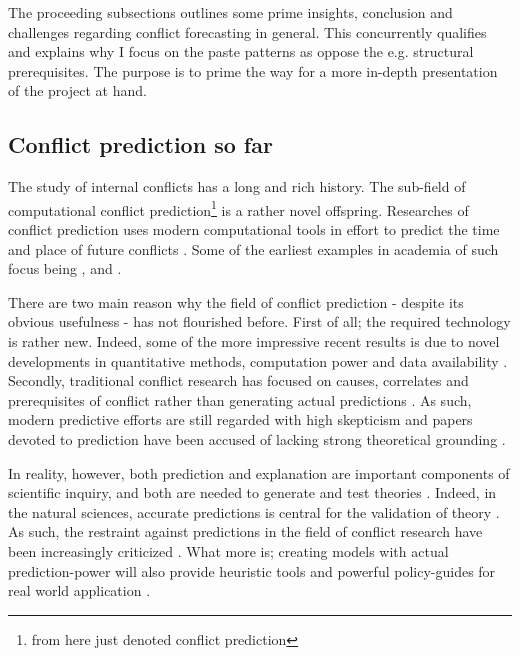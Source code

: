 \documentclass[a4paper]{article}
\begin{document}

The proceeding subsections outlines some prime insights, conclusion and challenges regarding conflict forecasting in general. This concurrently qualifies and explains why I focus on the paste patterns as oppose the e.g. structural prerequisites. The purpose is to prime the way for a more in-depth presentation of the project at hand.\par

\subsection{Conflict prediction so far}

The study of internal conflicts has a long and rich history. The sub-field of computational conflict prediction\footnote{from here just denoted conflict prediction} is a rather novel offspring. Researches of conflict prediction uses modern computational tools in effort to predict the time and place of future conflicts \citep{cederman2017predicting, chadefaux2017conflict}. Some of the earliest examples in academia of such focus being \cite{Goldstone_2010}, \cite{Hegre2013} and \cite{perry_2013}.\par

There are two main reason why the field of conflict prediction - despite its obvious usefulness - has not flourished before. First of all; the required technology is rather new. Indeed, some of the more impressive recent results is due to novel developments in quantitative methods, computation power and data availability \citep{ol2010afghanistan, perry_2013}. Secondly, traditional conflict research has focused on causes, correlates and prerequisites of conflict rather than generating actual predictions \citep[8]{chadefaux2017conflict}. As such, modern predictive efforts are still regarded with high skepticism and papers devoted to prediction have been accused of lacking strong theoretical grounding \citep[8-9]{chadefaux2017conflict}. 

In reality, however, both prediction and explanation are important components of scientific inquiry, and both are needed to generate and test theories \citep{Schrodt_2014, chadefaux2017conflict}. Indeed, in the natural sciences, accurate predictions is central for the validation of theory \citep[289]{Schrodt_2014}. As such, the restraint against predictions in the field of conflict research have been increasingly criticized \citep{King_Zeng_2001, Ward_Greenhill_Bakke_2010, Goldstone_2010, Schrodt_2014, chadefaux2017conflict}. What more is; creating models with actual prediction-power will also provide heuristic tools and powerful policy-guides for real world application \citep[372]{Ward_Greenhill_Bakke_2010}.
\end{document}

